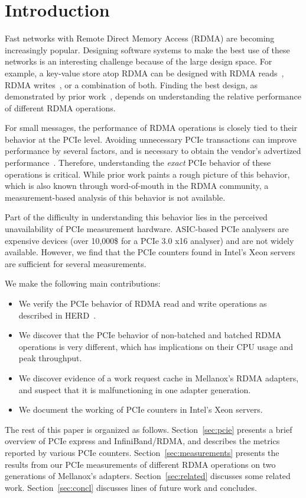 \section{Introduction}
\label{sec:intro}

Fast networks with Remote Direct Memory Access (RDMA) are becoming increasingly
popular.  Designing software systems to make the best use of these networks
is an interesting challenge because of the large design space. For example,
a key-value store atop RDMA can be designed with RDMA reads~\cite{Pilaf, FaRM},
RDMA writes~\cite{Kalia:sigcomm2014}, or a combination of both. Finding the
best design, as demonstrated by prior work~\cite{Kalia:sigcomm2014}, depends on
understanding the relative performance of different RDMA operations.

For small messages, the performance of RDMA operations is closely tied to their
behavior at the PCIe level. Avoiding unnecessary PCIe transactions can improve
performance by several factors, and is necessary to obtain the vendor's
advertized performance~\cite{Kalia:sigcomm2014}. Therefore, understanding the
\emph{exact} PCIe behavior of these operations is critical. While prior work
paints a rough picture of this behavior, which is also known through
word-of-mouth in the RDMA community, a measurement-based analysis of this
behavior is not available.

Part of the difficulty in understanding this behavior lies in the perceived
unavailability of PCIe measurement hardware. ASIC-based PCIe analysers are
expensive devices (over 10,000\$ for a PCIe 3.0 x16 analyser) and are not
widely available. However, we find that the PCIe counters found in Intel's
Xeon servers are sufficient for several measurements.

We make the following main contributions:
\begin{itemize}
\item We verify the PCIe behavior of RDMA read and write operations as
described in HERD~\cite{Kalia:sigcomm2014}.
\item We discover that the PCIe behavior of non-batched and batched RDMA
operations is very different, which has implications on their CPU usage and
peak throughput.
\item We discover evidence of a work request cache in Mellanox's RDMA adapters,
and suspect that it is malfunctioning in one adapter generation.
\item We document the working of PCIe counters in Intel's Xeon servers.
\end{itemize}

The rest of this paper is organized as follows. Section~\ref{sec:pcie} presents
a brief overview of PCIe express and InfiniBand/RDMA, and describes the
metrics reported by various PCIe counters. Section~\ref{sec:measurements}
presents the results from our PCIe measurements of different RDMA operations
on two generations of Mellanox's adapters. Section~\ref{sec:related} discusses
some related work. Section~\ref{sec:concl} discusses lines of future work and
concludes.
